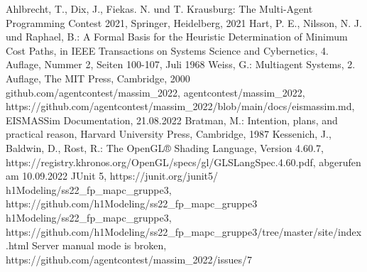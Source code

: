 \documentclass[runningheads]{llncs}
\begin{document}
%
%
%
% 
% 
%
\begin{thebibliography}{8}
	Ahlbrecht, T., Dix, J., Fiekas. N. und T. Krausburg: The Multi-Agent Programming Contest 2021, Springer, Heidelberg, 2021
	Hart, P. E., Nilsson, N. J. und Raphael, B.: A Formal Basis for the Heuristic Determination of Minimum Cost Paths, in IEEE Transactions on Systems Science and Cybernetics, 4. Auflage, Nummer 2, Seiten 100-107, Juli 1968
	Weiss, G.: Multiagent Systems, 2. Auflage, The MIT Press, Cambridge, 2000
	github.com/agentcontest/massim\_2022, agentcontest/massim\_2022, \\ https://github.com/agentcontest/massim\_2022/blob/main/docs/eismassim.md, EISMASSim Documentation, 21.08.2022
	Bratman, M.: Intention, plans, and practical reason, Harvard University Press, Cambridge, 1987
	Kessenich, J., Baldwin, D., Rost, R.: The OpenGL® Shading Language, Version 4.60.7, https://registry.khronos.org/OpenGL/specs/gl/GLSLangSpec.4.60.pdf, abgerufen am 10.09.2022
	JUnit 5, https://junit.org/junit5/
	h1Modeling/ss22\_fp\_mapc\_gruppe3, https://github.com/h1Modeling/ss22\_fp\_mapc\_gruppe3
	h1Modeling/ss22\_fp\_mapc\_gruppe3, \\ https://github.com/h1Modeling/ss22\_fp\_mapc\_gruppe3/tree/master/site/index.html
	Server manual mode is broken, https://github.com/agentcontest/massim\_2022/issues/7
	
\end{thebibliography}
\end{document}
